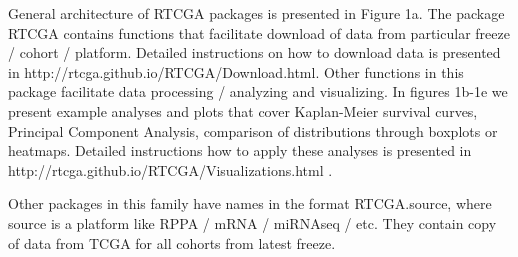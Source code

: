 \documentclass{bioinfo}
\begin{document}
General architecture of RTCGA packages is presented in Figure 1a. The package RTCGA contains functions that facilitate download of data from particular freeze / cohort / platform. Detailed instructions on how to download data is presented in http://rtcga.github.io/RTCGA/Download.html. Other functions in this package facilitate data processing / analyzing and visualizing. In figures 1b-1e we present example analyses and plots that cover Kaplan-Meier survival curves, Principal Component Analysis, comparison of distributions through boxplots or heatmaps. Detailed instructions how to apply these analyses is presented in http://rtcga.github.io/RTCGA/Visualizations.html .

Other packages in this family have names in the format RTCGA.source, where source is a platform like RPPA / mRNA / miRNAseq / etc. They contain copy of data from TCGA for all cohorts from latest freeze.   
\end{document}
